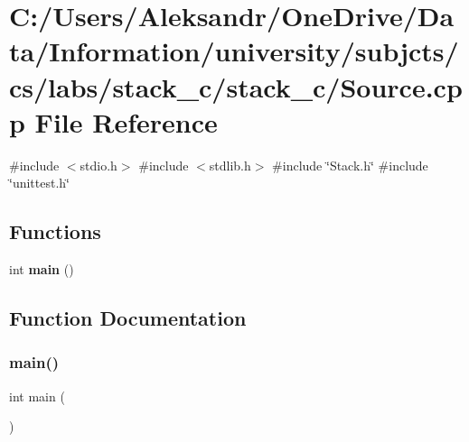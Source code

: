 \section{C\+:/\+Users/\+Aleksandr/\+One\+Drive/\+Data/\+Information/university/subjcts/cs/labs/stack\+\_\+c/stack\+\_\+c/\+Source.cpp File Reference}
\label{_source_8cpp}
{\ttfamily \#include $<$stdio.\+h$>$}\newline
{\ttfamily \#include $<$stdlib.\+h$>$}\newline
{\ttfamily \#include \char`\"{}Stack.\+h\char`\"{}}\newline
{\ttfamily \#include \char`\"{}unittest.\+h\char`\"{}}\newline
\subsection*{Functions}
\begin{DoxyCompactItemize}
\item 
int \textbf{ main} ()
\end{DoxyCompactItemize}


\subsection{Function Documentation}
\mbox{\label{_source_8cpp_ae66f6b31b5ad750f1fe042a706a4e3d4}} 
\subsubsection{main()}
{\footnotesize\ttfamily int main (\begin{DoxyParamCaption}{ }\end{DoxyParamCaption})}

